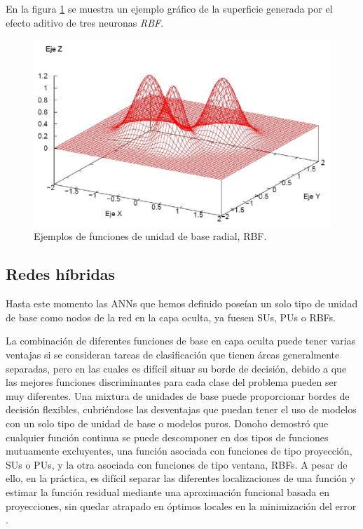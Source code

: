 En la figura \ref{ejemploRadial} se muestra un ejemplo gráfico de la superficie generada
por el efecto aditivo de tres neuronas \textit{RBF}.
\begin{figure}[htb]
\centering
\includegraphics[keepaspectratio,width=12.5cm]{figuras/ejemploRadial.jpg}
\caption{Ejemplos de funciones de unidad de base radial, RBF.}
\label{ejemploRadial}
\end{figure}

\subsection{Redes híbridas}\label{redesHibridas}
\noindent Hasta este momento las ANNs que hemos definido poseían un solo tipo de
unidad de base como nodos de la red en la capa oculta, ya fuesen SUs, PUs o RBFs.

La combinación de diferentes funciones de base en capa oculta puede tener varias
ventajas si se consideran tareas de clasificación que tienen áreas generalmente
separadas, pero en las cuales es difícil situar su borde de decisión, debido a que las
mejores funciones discriminantes para cada clase del problema pueden ser muy diferentes.
Una mixtura de unidades de base puede proporcionar bordes de decisión flexibles,
cubriéndose las desventajas que puedan tener el uso de modelos con un solo tipo de unidad
de base o modelos puros. Donoho \cite{Donoho1989} demostró que cualquier función continua
se puede descomponer en dos tipos de funciones mutuamente excluyentes, una función
asociada con funciones de tipo proyección, SUs o PUs, y la otra asociada con funciones de
tipo ventana, RBFs. A pesar de
ello, en la práctica, es difícil separar las diferentes
localizaciones de una función y estimar la función residual mediante una aproximación
funcional basada en proyecciones, sin quedar atrapado en óptimos locales en la
minimización del error \cite{Friedman1991}.

